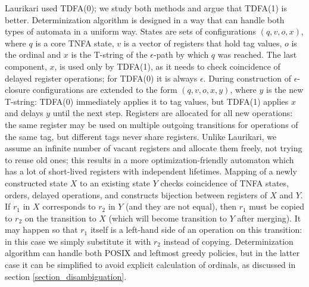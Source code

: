 \documentclass{article}
\theoremstyle{definition}
\begin{document}
\begin{multicols}{2}
Laurikari used TDFA(0); we study both methods and argue that TDFA(1) is better.
Determinization algorithm is designed in a way that can handle both types of automata in a uniform way.
States are sets of configurations $(q, v, o, x)$,
where $q$ is a core TNFA state, $v$ is a vector of registers that hold tag values, $o$ is the ordinal
and $x$ is the T-string of the $\epsilon$-path by which $q$ was reached.
The last component, $x$, is used only by TDFA(1), as it needs to check coincidence of delayed register operations;
for TDFA(0) it is always $\epsilon$.
During construction of $\epsilon$-closure configurations are extended to the form $(q, v, o, x, y)$,
where $y$ is the new T-string: TDFA(0) immediately applies it to tag values,
but TDFA(1) applies $x$ and delays $y$ until the next step.
Registers are allocated for all new operations:
the same register may be used on multiple outgoing transitions for operations of the same tag,
but different tags never share registers.
Unlike Laurikari, we assume an infinite number of vacant registers and allocate them freely, not trying to reuse old ones;
this results in a more optimization-friendly automaton
which has a lot of short-lived registers with independent lifetimes.
Mapping of a newly constructed state $X$ to an existing state $Y$ checks coincidence of TNFA states, orders, delayed operations,
and constructs bijection between registers of $X$ and $Y$.
If $r_1$ in $X$ corresponds to $r_2$ in $Y$ (and they are not equal), then $r_1$ must be copied to $r_2$ on the transition to $X$
(which will become transition to $Y$ after merging).
It may happen so that $r_1$ itself is a left-hand side of an operation on this transition:
in this case we simply substitute it with $r_2$ instead of copying.
Determinization algorithm can handle both POSIX and leftmost greedy policies,
but in the latter case it can be simplified to avoid explicit calculation of ordinals, as discussed in section \ref{section_disambiguation}.
\\



\end{multicols}
\end{document}

